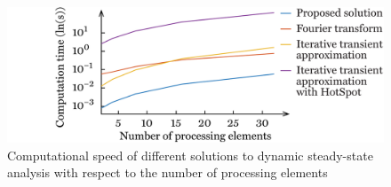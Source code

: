 \begin{figure}
  \centering
  \includegraphics[width=1.0\linewidth]{include/assets/figures/dream-dynamic-steady-speed-elements.pdf}
  \caption{
    Computational speed of different solutions to dynamic steady-state analysis
    with respect to the number of processing elements
  }
\end{figure}
